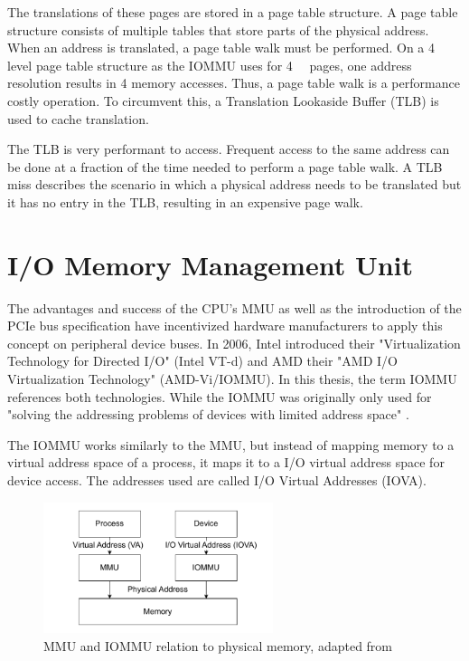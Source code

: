 The translations of these pages are stored in a page table structure. A page table structure consists of multiple tables that store parts of the physical address. When an address is translated, a page table walk must be performed. On a 4 level page table structure as the IOMMU uses for \qty{4}{\kibi\byte} pages, one address resolution results in 4 memory accesses. Thus, a page table walk is a performance costly operation. To circumvent this, a Translation Lookaside Buffer (TLB) is used to cache translation.

The TLB is very performant to access. Frequent access to the same address can be done at a fraction of the time needed to perform a page table walk. A TLB miss describes the scenario in which a physical address needs to be translated but it has no entry in the TLB, resulting in an expensive page walk.

\section{I/O Memory Management Unit}
The advantages and success of the CPU's MMU as well as the introduction of the PCIe bus specification have incentivized hardware manufacturers to apply this concept on peripheral device buses. In 2006, Intel introduced their "Virtualization Technology for Directed I/O" (Intel VT-d) and AMD their "AMD I/O Virtualization Technology" (AMD-Vi/IOMMU). In this thesis, the term IOMMU references both technologies. While the IOMMU was originally only used for "solving the addressing problems of devices with limited address space" \cite{vfiokerneldocs}.

The IOMMU works similarly to the MMU, but instead of mapping memory to a virtual address space of a process, it maps it to a I/O virtual address space for device access. The addresses used are called I/O Virtual Addresses (IOVA).

\begin{figure}[H]
    \centering
    \includegraphics[width=0.6\textwidth]{figures/MMUIOMMU.pdf}
    \caption{MMU and IOMMU relation to physical memory, adapted from \cite{iommuscalability}}
    \label{fig:mmuvsiommu}
\end{figure}

